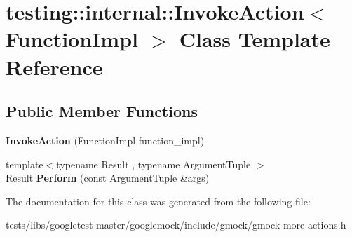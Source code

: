 \hypertarget{classtesting_1_1internal_1_1InvokeAction}{}\section{testing\+:\+:internal\+:\+:Invoke\+Action$<$ Function\+Impl $>$ Class Template Reference}
\label{classtesting_1_1internal_1_1InvokeAction}
\subsection*{Public Member Functions}
\begin{DoxyCompactItemize}
\item 
\mbox{\label{classtesting_1_1internal_1_1InvokeAction_a786ce772624fc87a31891f465df7ce61}} 
{\bfseries Invoke\+Action} (Function\+Impl function\+\_\+impl)
\item 
\mbox{\label{classtesting_1_1internal_1_1InvokeAction_af357ce691795b3520de1fda4ab8af8b2}} 
{\footnotesize template$<$typename Result , typename Argument\+Tuple $>$ }\\Result {\bfseries Perform} (const Argument\+Tuple \&args)
\end{DoxyCompactItemize}


The documentation for this class was generated from the following file\+:\begin{DoxyCompactItemize}
\item 
tests/libs/googletest-\/master/googlemock/include/gmock/gmock-\/more-\/actions.\+h\end{DoxyCompactItemize}
